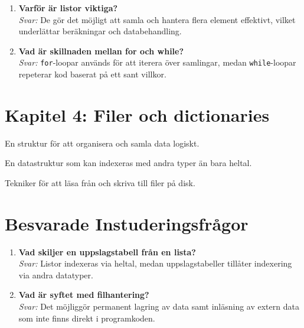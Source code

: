 \documentclass[11pt,a4paper]{article}
\begin{document}
\begin{enumerate}[label=\bfseries\color{primary}Fråga \arabic*:, leftmargin=1.8cm]
    \item \textbf{Varför är listor viktiga?}
    \\ \textit{Svar:} De gör det möjligt att samla och hantera flera element effektivt, vilket underlättar beräkningar och databehandling.
    
    \item \textbf{Vad är skillnaden mellan for och while?}
    \\ \textit{Svar:} \texttt{for}-loopar används för att iterera över samlingar, medan \texttt{while}-loopar repeterar kod baserat på ett sant villkor.
\end{enumerate}

\section{Kapitel 4: Filer och dictionaries}

\begin{description}[style=nextline, leftmargin=1cm, labelindent=0.5cm]
    \item[\color{primary}Datastruktur] En struktur för att organisera och samla data logiskt.
    \item[\color{primary}Uppslagstabell] En datastruktur som kan indexeras med andra typer än bara heltal.
    \item[\color{primary}Filhantering] Tekniker för att läsa från och skriva till filer på disk.
\end{description}

\section*{Besvarade Instuderingsfrågor}
\begin{enumerate}[label=\bfseries\color{primary}Fråga \arabic*:, leftmargin=1.8cm]
    \item \textbf{Vad skiljer en uppslagstabell från en lista?}
    \\ \textit{Svar:} Listor indexeras via heltal, medan uppslagstabeller tillåter indexering via andra datatyper.
    
    \item \textbf{Vad är syftet med filhantering?}
    \\ \textit{Svar:} Det möjliggör permanent lagring av data samt inläsning av extern data som inte finns direkt i programkoden.
\end{enumerate}
\end{document}
